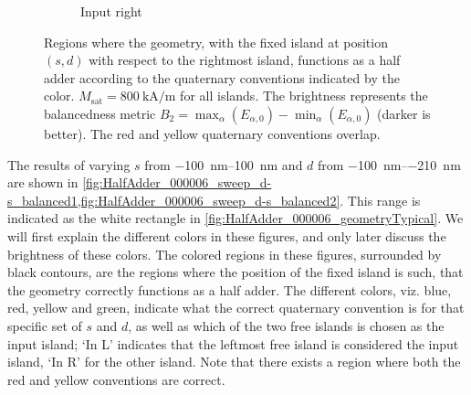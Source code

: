 \documentclass[11pt,a4paper,english]{article}
\begin{document}
\begin{figure}
\begin{subfigure}[t]{0.594\textwidth}
        \caption{Input right}
    \label{fig:HalfAdder_000006_sweep_d-s_balanced2-R}
    \end{subfigure}
    \caption{Regions where the geometry, with the fixed island at position $(s, d)$ with respect to the rightmost island, functions as a half adder according to the quaternary conventions indicated by the color. $M_\mathrm{sat} = \SI{800}{\kilo\ampere\per\metre}$ for all islands. The brightness represents the balancedness metric $B_2 = \max_\alpha(E_{\alpha,0}) - \min_\alpha(E_{\alpha,0})$ (darker is better). The red and yellow quaternary conventions overlap.}
    \label{fig:HalfAdder_000006_sweep_d-s_balanced2}
\end{figure}
The results of varying $s$ from \SIrange{-100}{100}{\nano\metre} and $d$ from \SIrange{-100}{-210}{\nano\metre} are shown in \cref{fig:HalfAdder_000006_sweep_d-s_balanced1,fig:HalfAdder_000006_sweep_d-s_balanced2}. This range is indicated as the white rectangle in \cref{fig:HalfAdder_000006_geometryTypical}. We will first explain the different colors in these figures, and only later discuss the brightness of these colors. The colored regions in these figures, surrounded by black contours, are the regions where the position of the fixed island is such, that the geometry correctly functions as a half adder. The different colors, viz. blue, red, yellow and green, indicate what the correct quaternary convention is for that specific set of $s$ and $d$, as well as which of the two free islands is chosen as the input island; `In L' indicates that the leftmost free island is considered the input island, `In R' for the other island. Note that there exists a region where both the red and yellow conventions are correct. \par
\end{document}
